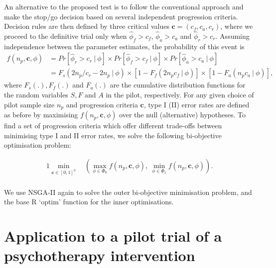 \documentclass[AMA,STIX1COL]{WileyNJD-v2}
\begin{document}
An alternative to the proposed test is to follow the conventional approach and make the stop/go decision based on several independent progression criteria. Decision rules are then defined by three critical values $\mathbf{c} = (c_f, c_a, c_r)$, where we proceed to the definitive trial only when $\hat{\phi}_f > c_f$, $\hat{\phi}_a > c_a$ and $\hat{\phi}_r > c_r$. Assuming independence between the parameter estimates, the probability of this event is
\begin{align*}
f(n_p, \mathbf{c}, \phi) &= Pr[\hat{\phi}_r > c_r ~ | ~ \phi] \times Pr[ \hat{\phi}_f > c_f ~ | ~ \phi] \times Pr[ \hat{\phi}_a > c_a ~ | ~ \phi] \\
&= F_s( 2n_p/c_r - 2n_p ~ | ~ \phi) \times [1-F_f(2n_p c_f ~ | ~ \phi)] \times [1-F_a(n_p c_a ~ | ~ \phi)],
\end{align*}
where $F_s(.), F_f(.)$ and $F_a(.)$ are the cumulative distribution functions for the random variables $S, F$ and $A$ in the pilot, respectively. For any given choice of pilot sample size $n_p$ and progression criteria $\mathbf{c}$, type I (II) error rates are defined as before by maximising $f(n_p, \mathbf{c}, \phi)$ over the null (alternative) hypotheses. To find a set of progression criteria which offer different trade-offs between minimising type I and II error rates, we solve the following bi-objective optimisation problem:

\begin{alignat*}{1}
\min_{\mathbf{c} \in [0,1]^3} ~ & \left( \max_{\phi \in \Phi_0} f(n_p, \mathbf{c}, \phi) , ~ \min_{\phi \in \Phi_1} f(n_p, \mathbf{c}, \phi) \right). \\
\end{alignat*}

We use NSGA-II again to solve the outer bi-objective minimisation problem, and the base R `optim' function for the inner optimisations.

\section{Application to a pilot trial of a psychotherapy intervention}\label{sec:example}
\end{document}
